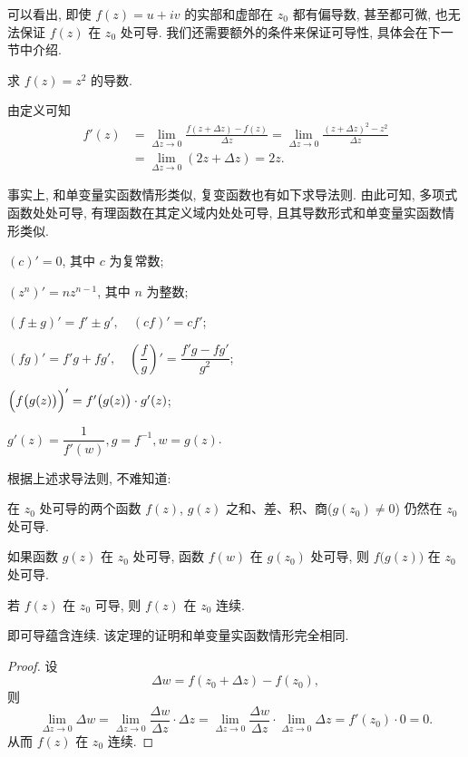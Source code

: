 可以看出, 即使 $f(z)=u+iv$ 的实部和虚部在 $z_0$ 都有偏导数, 甚至都可微, 也无法保证 $f(z)$ 在 $z_0$ 处可导.
我们还需要额外的条件来保证可导性, 具体会在下一节中介绍.

\begin{example}
  求 $f(z)=z^2$ 的导数.
\end{example}

\begin{solution}
  由定义可知
  \begin{align*}
  f'(z)&=\lim_{\Delta z\to 0}\frac{f(z+\Delta z)-f(z)}{\Delta z}
   =\lim_{\Delta z\to 0}\frac{(z+\Delta z)^2-z^2}{\Delta z}\\
  &=\lim_{\Delta z\to 0}(2z+\Delta z)=2z.
  \end{align*}
\end{solution}

事实上, 和单变量实函数情形类似, 复变函数也有如下求导法则.
由此可知, 多项式函数处处可导, 有理函数在其定义域内处处可导, 且其导数形式和单变量实函数情形类似.
\begin{theorem}
  \begin{enumpar}
    \item $(c)'=0$, 其中 $c$ 为复常数;
    \item $(z^n)'=nz^{n-1}$, 其中 $n$ 为整数;
    \item $(f\pm g)'=f'\pm g',\quad (cf)'=cf'$;
    \item $(fg)'=f'g+fg',\quad \left(\dfrac fg\right)'=\dfrac{f'g-fg'}{g^2}$;
    \item $\Bigl(f\bigl(g(z)\bigr)\Bigr)'=f'\bigl(g(z)\bigr)\cdot g'(z)$;
    \item $g'(z)=\dfrac1{f'(w)}, g=f^{-1}, w=g(z)$.
  \end{enumpar}
\end{theorem}

根据上述求导法则, 不难知道:
\begin{theorem}\label{thm:four-derivable}
  \begin{enumpar}
    \item 在 $z_0$ 处可导的两个函数 $f(z)$, $g(z)$ 之和、差、积、商($g(z_0)\neq 0$) 仍然在 $z_0$ 处可导.
    \item 如果函数 $g(z)$ 在 $z_0$ 处可导, 函数 $f(w)$ 在 $g(z_0)$ 处可导, 则 $f\bigl(g(z)\bigr)$ 在 $z_0$ 处可导.
  \end{enumpar}
\end{theorem}

\begin{theorem}
  若 $f(z)$ 在 $z_0$ 可导, 则 $f(z)$ 在 $z_0$ 连续.
\end{theorem}
即可导蕴含连续. 该定理的证明和单变量实函数情形完全相同.
\begin{proof}
  设
    \[\Delta w=f(z_0+\Delta z)-f(z_0),\]
  则
    \[
      \lim_{\Delta z\to 0}\Delta w
      =\lim_{\Delta z\to 0}\frac{\Delta w}{\Delta z}\cdot\Delta z
      =\lim_{\Delta z\to 0}\frac{\Delta w}{\Delta z}\cdot
        \lim_{\Delta z\to 0}\Delta z
      =f'(z_0)\cdot 0=0.
    \]
  从而 $f(z)$ 在 $z_0$ 连续.
\end{proof}


